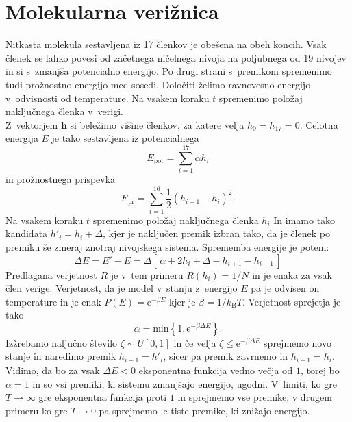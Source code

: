 \documentclass[a4paper,pdftex,10pt]{article}
\renewcommand{\vec}[1]{\boldsymbol{\mathbf{#1}}}
\numberwithin{figure}{section} %
\begin{document}
\pagebreak
\section{Molekularna verižnica}
Nitkasta molekula sestavljena iz 17 členkov je obešena na obeh koncih. Vsak členek se lahko
povesi od začetnega ničelnega nivoja na poljubnega od 19 nivojev in si s~zmanjša potencialno
energijo. Po drugi strani s~premikom spremenimo tudi prožnostno energijo med sosedi. 
Določiti želimo ravnovesno energijo v~odvisnosti od temperature. Na vsakem koraku $t$ 
spremenimo položaj naključnega členka v~verigi. \\
Z~vektorjem $\vec{h}$ si beležimo višine členkov, za katere velja $h_0 = h_{17} = 0$.
Celotna energija $E$ je tako sestavljena iz potencialnega
\begin{equation}
    E_{\text{pot}} = \sum_{i=1}^{17} \alpha h_i 
\end{equation}
in prožnostnega prispevka
\begin{equation}
    E_{\text{pr}} = \sum_{i=1}^{16} \frac{1}{2} (h_{i+1} -h_i)^2.
\end{equation}
Na vsakem koraku $t$ spremenimo položaj naključnega členka $h_i$ In imamo tako kandidata
$h'_i = h_i + \Delta$, kjer je naključen premik izbran tako, da je členek po premiku še 
zmeraj znotraj nivojskega sistema. Sprememba energije je potem:
\begin{equation}
    \Delta E = E' - E = \Delta \left[ \, \alpha + 2 h_i + \Delta - h_{i+1} - h_{i-1} 
    \, \right]
\end{equation}
Predlagana verjetnost $R$ je v~tem primeru $R(h_i) = 1/N$ in je enaka za vsak člen verige.
Verjetnost, da je model v~stanju z~energijo $E$ pa je odvisen on temperature in je enak 
$P(E) = \mathrm{e}^{- \beta E}$ kjer je $\beta = 1/k_{\mathrm{B}} T $. Verjetnost sprejetja
je tako
\begin{equation}
    \alpha = \text{min} \left\{ 1, \mathrm{e}^{- \beta \Delta E}  \right\}.
\end{equation}
Izžrebamo naljučno število $\zeta \sim U[0,1]$ in če velja $\zeta \leq \mathrm{e}^{- \beta 
\Delta E}$ sprejmemo novo stanje in naredimo premik $h_{i+1} = h'_i$, sicer pa premik
zavrnemo in $h_{i+1} = h_i$. Vidimo, da bo za vsak $\Delta E < 0$ eksponentna funkcija
vedno večja od $1$, torej bo $\alpha=1$ in so vsi premiki, ki sistemu zmanjšajo energijo,
ugodni. V~limiti, ko gre $T \rightarrow \infty$ gre eksponentna funkcija proti $1$ in 
sprejmemo vse premike, v drugem primeru ko gre $T \rightarrow 0$ pa sprejmemo le tiste
premike, ki znižajo energijo.
\end{document}
